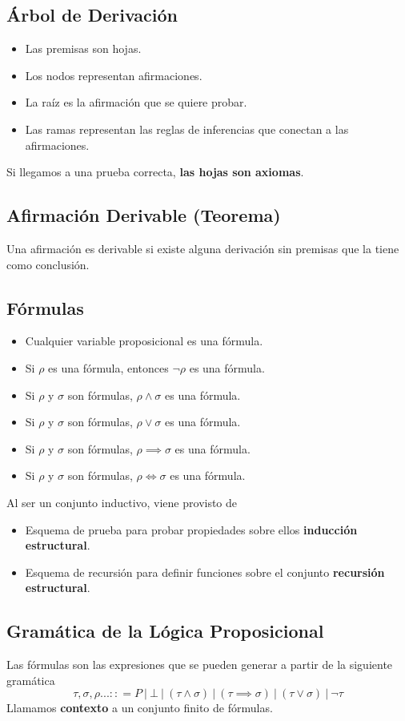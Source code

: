 \documentclass[10pt,a4paper]{article}
\begin{document}
\subsection*{Árbol de Derivación}
\begin{itemize}
    \item Las premisas son hojas.
    \item Los nodos representan afirmaciones.
    \item La raíz es la afirmación que se quiere probar.
    \item Las ramas representan las reglas de inferencias que conectan a las afirmaciones. 
\end{itemize}
Si llegamos a una prueba correcta, \textbf{las hojas son axiomas}.
\subsection*{Afirmación Derivable (Teorema)}
Una afirmación es derivable si existe alguna derivación sin premisas que la tiene como conclusión.
\subsection*{Fórmulas}
\begin{itemize}
    \item Cualquier variable proposicional es una fórmula.
    \item Si $\rho$ es una fórmula, entonces $\neg \rho$ es una fórmula.
    \item Si $\rho$ y $\sigma$ son fórmulas, $\rho \land \sigma$ es una fórmula.
    \item Si $\rho$ y $\sigma$ son fórmulas, $\rho \lor \sigma$ es una fórmula.
    \item Si $\rho$ y $\sigma$ son fórmulas, $\rho \implies \sigma$ es una fórmula.
    \item Si $\rho$ y $\sigma$ son fórmulas, $\rho \iff \sigma$ es una fórmula.
\end{itemize}
Al ser un conjunto inductivo, viene provisto de 
\begin{itemize}
    \item Esquema de prueba para probar propiedades sobre ellos \textbf{inducción estructural}.
    \item Esquema de recursión para definir funciones sobre el conjunto \textbf{recursión estructural}.
\end{itemize}
\subsection*{Gramática de la Lógica Proposicional}
Las fórmulas son las expresiones que se pueden generar a partir de la siguiente gramática 
\[\tau, \sigma, \rho ... :: = P \ | \ \bot \ | \ (\tau \land \sigma) \ | \ (\tau \implies \sigma) \ | \ (\tau \lor \sigma) \ | \ \neg \tau\] 
Llamamos \textbf{contexto} a un conjunto finito de fórmulas.
\end{document}
